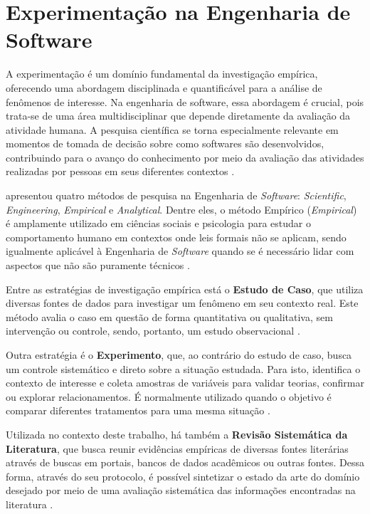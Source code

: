 \section{Experimentação na Engenharia de Software}
\label{subsec:experimentacao}

A experimentação é um domínio fundamental da investigação empírica, oferecendo uma abordagem disciplinada e quantificável para a análise de fenômenos de interesse. Na engenharia de software, essa abordagem é crucial, pois trata-se de uma área multidisciplinar que depende diretamente da avaliação da atividade humana. A pesquisa científica se torna especialmente relevante em momentos de tomada de decisão sobre como softwares são desenvolvidos, contribuindo para o avanço do conhecimento por meio da avaliação das atividades realizadas por pessoas em seus diferentes contextos \cite{wohlin_experimentation_2012}.

 apresentou quatro métodos de pesquisa na Engenharia de \textit{Software}: \textit{Scientific}, \textit{Engineering}, \textit{Empirical} e \textit{Analytical}. Dentre eles, o método Empírico (\textit{Empirical}) é amplamente utilizado em ciências sociais e psicologia para estudar o comportamento humano em contextos onde leis formais não se aplicam, sendo igualmente aplicável à Engenharia de \textit{Software} quando se é necessário lidar com aspectos que não são puramente técnicos \cite{wohlin_experimentation_2012}.

Entre as estratégias de investigação empírica está o \textbf{Estudo de Caso}, que utiliza diversas fontes de dados para investigar um fenômeno em seu contexto real. Este método avalia o caso em questão de forma quantitativa ou qualitativa, sem intervenção ou controle, sendo, portanto, um estudo observacional \cite{runeson_case_study_2012}.

Outra estratégia é o \textbf{Experimento}, que, ao contrário do estudo de caso, busca um controle sistemático e direto sobre a situação estudada. Para isto, identifica o contexto de interesse e coleta amostras de variáveis para validar teorias, confirmar ou explorar relacionamentos. É normalmente utilizado quando o objetivo é comparar diferentes tratamentos para uma mesma situação \cite{wohlin_experimentation_2012}.

Utilizada no contexto deste trabalho, há também a \textbf{Revisão Sistemática da Literatura}, que busca reunir evidências empíricas de diversas fontes literárias através de buscas em portais, bancos de dados acadêmicos ou outras fontes. Dessa forma, através do seu protocolo, é possível sintetizar o estado da arte do domínio desejado por meio de uma avaliação sistemática das informações encontradas na literatura \cite{kitchenham_rsl}.

